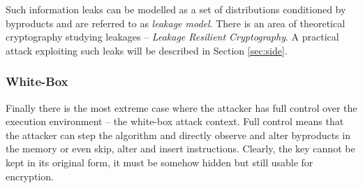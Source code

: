 Such information leaks can be modelled as a set of distributions conditioned by byproducts and are referred to as {\em leakage model}. There is an area of theoretical cryptography studying leakages -- {\em Leakage Resilient Cryptography}. A practical attack exploiting such leaks will be described in Section \ref{sec:side}.   %

\subsubsection{White-Box}

Finally there is the most extreme case where the attacker has full control over the execution environment -- the white-box attack context. Full control means that the attacker can step the algorithm and directly observe and alter byproducts in the memory or even skip, alter and insert instructions. Clearly, the key cannot be kept in its original form, it must be somehow hidden but still usable for encryption.

